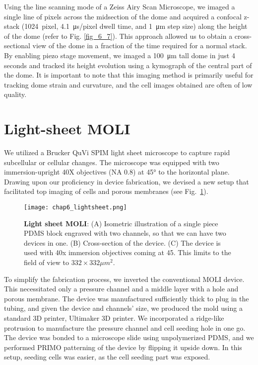 Using the line scanning mode of a Zeiss Airy Scan Microscope, we imaged a single line of pixels across the midsection of the dome and acquired a confocal z-stack (1024~pixel, 4.1~\unit{\us/pixel} dwell time, and 1~\unit{\um} step size) along the height of the dome (refer to Fig. \ref{fig_6_7}). This approach allowed us to obtain a cross-sectional view of the dome in a fraction of the time required for a normal stack. By enabling piezo stage movement, we imaged a 100~\unit{\um} tall dome in just 4 seconds and tracked its height evolution using a kymograph of the central part of the dome. It is important to note that this imaging method is primarily useful for tracking dome strain and curvature, and the cell images obtained are often of low quality.


\hypertarget{light-sheet-moli}{%
\section{Light-sheet MOLI}\label{light-sheet-moli}}

We utilized a Brucker QuVi SPIM light sheet microscope to capture rapid subcellular or cellular changes. The microscope was equipped with two immersion-upright 40X objectives (NA 0.8) at 45\unit{\degree} to the horizontal plane. Drawing upon our proficiency in device fabrication, we devised a new setup that facilitated top imaging of cells and porous membranes (see Fig.~\ref{fig_6_8}).

\begin{figure}[h!]
	\centering
	\texttt{[image: chap6\_lightsheet.png]}
	\caption{ \textbf{Light sheet MOLI}: (A) Isometric illustration of a single piece PDMS block engraved with two channels, so that we can have two devices in one. (B) Cross-section of the device. (C) The device is used with 40x immersion objectives coming at 45\textdegree. This limits to the field of view to $332\times 332\mu m^2$.
	}\label{fig_6_8}
\end{figure}

To simplify the fabrication process, we inverted the conventional MOLI device. This necessitated only a pressure channel and a middle layer with a hole and porous membrane. The device was manufactured sufficiently thick to plug in the tubing, and given the device and channels' size, we produced the mold using a standard 3D printer, Ultimaker 3D printer. We incorporated a ridge-like protrusion to manufacture the pressure channel and cell seeding hole in one go. The device was bonded to a microscope slide using unpolymerized PDMS, and we performed PRIMO patterning of the device by flipping it upside down. In this setup, seeding cells was easier, as the cell seeding part was exposed.

